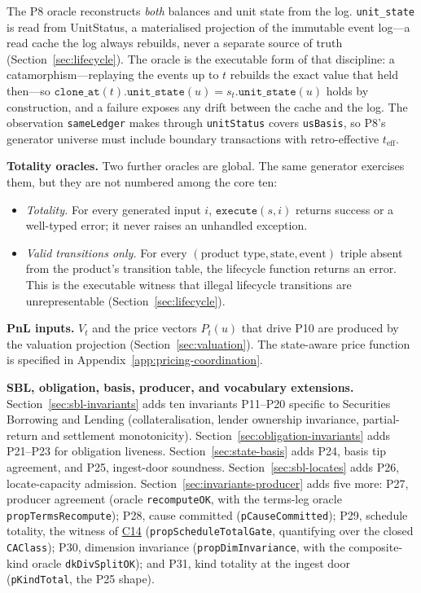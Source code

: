 \begin{remark}
The P8 oracle reconstructs \emph{both} balances and unit state from the log. \texttt{unit\_state} is read from UnitStatus, a materialised projection of the immutable event log---a read cache the log always rebuilds, never a separate source of truth (Section~\ref{sec:lifecycle}). The oracle is the executable form of that discipline: a catamorphism---replaying the events up to $t$ rebuilds the exact value that held then---so $\texttt{clone\_at}(t).\texttt{unit\_state}(u)=s_t.\texttt{unit\_state}(u)$ holds by construction, and a failure exposes any drift between the cache and the log. The observation \texttt{sameLedger} makes through \texttt{unitStatus} covers \texttt{usBasis}, so P8's generator universe must include boundary transactions with retro-effective $t_{\mathrm{eff}}$.
\end{remark}

\noindent\textbf{Totality oracles.} Two further oracles are global. The same generator exercises them, but they are not numbered among the core ten:
\begin{itemize}
\item \emph{Totality.} For every generated input $i$, $\texttt{execute}(s,i)$ returns success or a well-typed error; it never raises an unhandled exception.
\item \emph{Valid transitions only.} For every $(\text{product type},\text{state},\text{event})$ triple absent from the product's transition table, the lifecycle function returns an error. This is the executable witness that illegal lifecycle transitions are unrepresentable (Section~\ref{sec:lifecycle}).
\end{itemize}

\noindent\textbf{PnL inputs.} $V_t$ and the price vectors $P_t(u)$ that drive P10 are produced by the valuation projection (Section~\ref{sec:valuation}). The state-aware price function is specified in Appendix~\ref{app:pricing-coordination}.

\noindent\textbf{SBL, obligation, basis, producer, and vocabulary extensions.} Section~\ref{sec:sbl-invariants} adds ten invariants P11--P20 specific to Securities Borrowing and Lending (collateralisation, lender ownership invariance, partial-return and settlement monotonicity). Section~\ref{sec:obligation-invariants} adds P21--P23 for obligation liveness. Section~\ref{sec:state-basis} adds P24, basis tip agreement, and P25, ingest-door soundness. Section~\ref{sec:sbl-locates} adds P26, locate-capacity admission. Section~\ref{sec:invariants-producer} adds five more: P27, producer agreement (oracle \texttt{recomputeOK}, with the terms-leg oracle \texttt{propTermsRecompute}); P28, cause committed (\texttt{pCauseCommitted}); P29, schedule totality, the witness of \hyperref[cond:C14]{C14} (\texttt{propScheduleTotalGate}, quantifying over the closed \texttt{CAClass}); P30, dimension invariance (\texttt{propDimInvariance}, with the composite-kind oracle \texttt{dkDivSplitOK}); and P31, kind totality at the ingest door (\texttt{pKindTotal}, the P25 shape).

